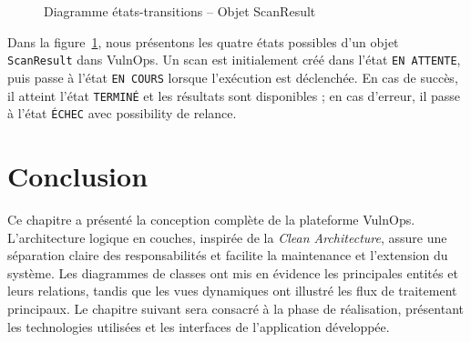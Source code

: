 \documentclass[12pt, a4paper, oneside]{report}
\begin{document}
\begin{figure}[H]
    \centering
    \caption{Diagramme états-transitions -- Objet ScanResult}
    \label{fig:statechart}
\end{figure}

Dans la figure~\ref{fig:statechart}, nous présentons les quatre états possibles
d'un objet \texttt{ScanResult} dans VulnOps. Un scan est initialement créé
dans l'état \texttt{EN ATTENTE}, puis passe à l'état \texttt{EN COURS} lorsque
l'exécution est déclenchée. En cas de succès, il atteint l'état \texttt{TERMINÉ}
et les résultats sont disponibles ; en cas d'erreur, il passe à l'état
\texttt{ÉCHEC} avec possibility de relance.

\section*{Conclusion}

Ce chapitre a présenté la conception complète de la plateforme VulnOps.
L'architecture logique en couches, inspirée de la \textit{Clean Architecture},
assure une séparation claire des responsabilités et facilite la maintenance
et l'extension du système. Les diagrammes de classes ont mis en évidence
les principales entités et leurs relations, tandis que les vues dynamiques
ont illustré les flux de traitement principaux. Le chapitre suivant sera
consacré à la phase de réalisation, présentant les technologies utilisées
et les interfaces de l'application développée.
\end{document}
